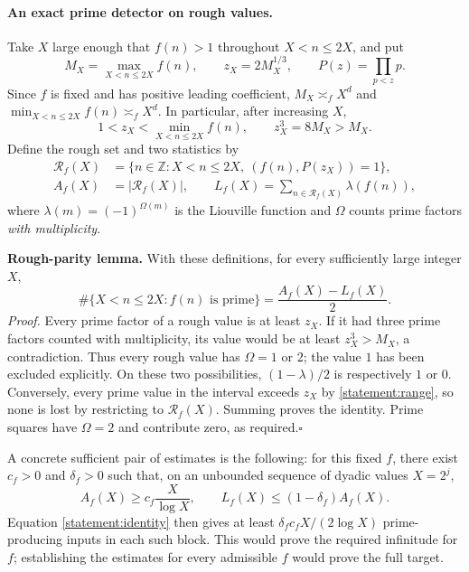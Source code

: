 \documentclass[11pt]{article}
\newcommand{\Z}{\mathbb{Z}}
\begin{document}
\paragraph{An exact prime detector on rough values.}
Take $X$ large enough that $f(n)>1$ throughout $X<n\le2X$, and put
\[
 M_X=\max_{X<n\le2X}f(n),\qquad z_X=2M_X^{1/3},\qquad
 P(z)=\prod_{p<z}p.
\]
Since $f$ is fixed and has positive leading coefficient,
$M_X\asymp_f X^d$ and $\min_{X<n\le2X}f(n)\asymp_f X^d$.
In particular, after increasing $X$,
\begin{equation}\label{statement:range}
 1<z_X<\min_{X<n\le2X}f(n),\qquad z_X^3=8M_X>M_X.
\end{equation}
Define the rough set and two statistics by
\begin{align*}
 \mathcal R_f(X)&=\{n\in\Z:X<n\le2X,\ (f(n),P(z_X))=1\},\\
 A_f(X)&=|\mathcal R_f(X)|,\qquad
 L_f(X)=\sum_{n\in\mathcal R_f(X)}\lambda(f(n)),
\end{align*}
where $\lambda(m)=(-1)^{\Omega(m)}$ is the Liouville function and
$\Omega$ counts prime factors \emph{with multiplicity}.

\textbf{Rough-parity lemma.} With these definitions, for every sufficiently
large integer $X$,
\begin{equation}\label{statement:identity}
 \#\{X<n\le2X:f(n)\text{ is prime}\}
       =\frac{A_f(X)-L_f(X)}2.
\end{equation}
\emph{Proof.} Every prime factor of a rough value is at least $z_X$.
If it had three prime factors counted with multiplicity, its value would be
at least $z_X^3>M_X$, a contradiction. Thus every rough value has
$\Omega=1$ or $2$; the value $1$ has been excluded explicitly.
On these two possibilities, $(1-\lambda)/2$ is respectively $1$ or $0$.
Conversely, every prime value in the interval exceeds $z_X$ by
\eqref{statement:range}, so none is lost by restricting to $\mathcal R_f(X)$.
Summing proves the identity. Prime squares have $\Omega=2$ and contribute
zero, as required.\hfill$\square$

A concrete sufficient pair of estimates is the following: for this fixed
$f$, there exist $c_f>0$ and $\delta_f>0$ such that, on an unbounded sequence
of dyadic values $X=2^j$,
\begin{equation}\label{statement:missing}
 A_f(X)\ge c_f\frac{X}{\log X},\qquad
 L_f(X)\le(1-\delta_f)A_f(X).
\end{equation}
Equation \eqref{statement:identity} then gives at least
$\delta_fc_fX/(2\log X)$ prime-producing inputs in each such block.
This would prove the required infinitude for $f$; establishing the estimates
for every admissible $f$ would prove the full target.
\end{document}
